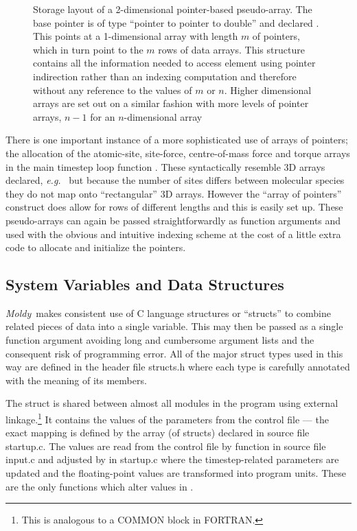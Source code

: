 \documentclass[a4paper,twoside]{report}
\newcommand{\Fname}[1]{{\upshape\mdseries\sffamily#1}}
\newcommand{\moldy}{\emph{Moldy}}
\newcommand{\eg}{\emph{e.g.}}
\begin{document}
\begin{figure}[tb]
  \begin{center}
    
  \end{center}
  \caption[Storage layout of a 2-dimensional pointer-based
    pseudo-array]{Storage layout of a 2-dimensional pointer-based
    pseudo-array. The base pointer  is of type ``pointer to
    pointer to double'' and declared .  This points
    at a 1-dimensional array with length $m$ of pointers, which in
    turn point to the $m$ rows of data arrays.  This structure
    contains all the information needed to access element
     using pointer indirection rather than an indexing
    computation and therefore without any reference to the values of
    $m$ or $n$.  Higher dimensional arrays are set out on a similar
    fashion with more levels of pointer arrays, $n-1$ for an
    $n$-dimensional array}
    \label{fig:arralloc}
\end{figure}

There is one important instance of a more sophisticated use of arrays
of pointers; the allocation of the atomic-site, site-force,
centre-of-mass force and torque arrays in the main timestep loop
function . These syntactically resemble 3D arrays
declared, \eg\  but because the
number of sites differs between molecular species they do not map onto
``rectangular'' 3D arrays.  However the ``array of pointers''
construct does allow for rows of different lengths and this is easily
set up.  These pseudo-arrays can again be passed straightforwardly as
function arguments and used with the obvious and intuitive indexing
scheme at the cost of a little extra code to allocate and initialize
the pointers.

\subsection{System Variables and Data Structures}
\label{sec:sysvars}

\moldy\ makes consistent use of C language structures or ``structs''
to combine related pieces of data into a single variable. This may
then be passed as a single function argument avoiding long and
cumbersome argument lists and the consequent risk of programming
error.  All of the major struct types used in this way are defined in
the header file \Fname{structs.h} where each type is carefully annotated
with the meaning of its members.

The struct  is shared between almost all modules in the
program using external linkage.\footnote{This is analogous to a COMMON
  block in FORTRAN.} It contains the values of the parameters from the
control file --- the exact mapping is defined by the array (of
structs)  declared in source file \Fname{startup.c}.  The
values are read from the control file by function
 in source file \Fname{input.c} and adjusted by
 in \Fname{startup.c} where the timestep-related
parameters are updated and the floating-point values are transformed
into program units.  These are the only functions which alter values
in .
\end{document}
